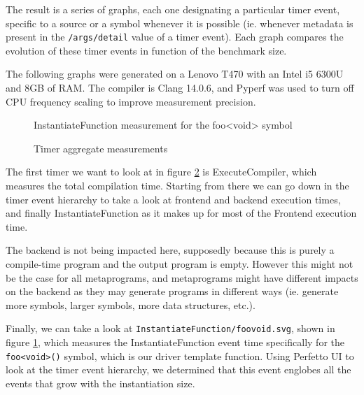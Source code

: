 \documentclass[../main]{subfiles}
\begin{document}
The result is a series of graphs, each one designating a particular timer event,
specific to a source or a symbol whenever it is possible (ie. whenever metadata
is present in the \lstinline{/args/detail} value of a timer event). Each graph
compares the evolution of these timer events in function of the benchmark size.

The following graphs were generated on a Lenovo T470 with an Intel i5 6300U and
8GB of RAM. The compiler is Clang 14.0.6, and Pyperf \cite{pyperf} was used
to turn off CPU frequency scaling to improve measurement precision.

\begin{figure}[h]
\fontsize{8}{10}\selectfont

\caption{InstantiateFunction measurement for the foo<void> symbol}
\label{fig:instantiate-foo-void}
\end{figure}

\begin{figure}[h]
\fontsize{8}{10}\selectfont

\caption{Timer aggregate measurements}
\label{fig:total-timers}
\end{figure}

The first timer we want to look at in figure \ref{fig:total-timers} is
ExecuteCompiler, which measures the total compilation time.
Starting from there we can go down in the timer event hierarchy to take a look
at frontend and backend execution times, and finally InstantiateFunction as
it makes up for most of the Frontend execution time.

The backend is not being impacted here, supposedly because this is purely a
compile-time program and the output program is empty. However this might not be
the case for all metaprograms, and metaprograms might have different impacts on
the backend as they may generate programs in different ways (ie. generate more
symbols, larger symbols, more data structures, etc.).

Finally, we can take a look at \lstinline{InstantiateFunction/foovoid.svg},
shown in figure \ref{fig:instantiate-foo-void}, which measures the
InstantiateFunction event time specifically for the \lstinline{foo<void>()}
symbol, which is our driver template function. Using Perfetto UI to look at the
timer event hierarchy, we determined that this event englobes all the events
that grow with the instantiation size.
\end{document}
